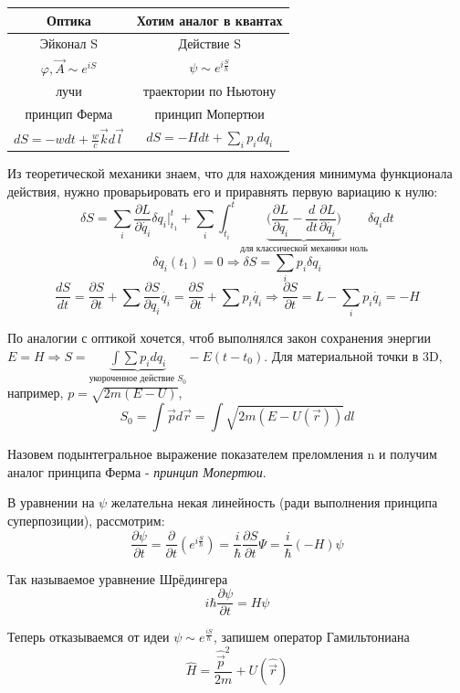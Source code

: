 \begin{table}[h]
\centering
\begin{tabular}[c]{|c|c|}
\hline 
Оптика & Хотим аналог в квантах \\ \hline 
Эйконал S & Действие S \\
$\varphi, \vec{A} \sim e^{iS} $ & $\psi \sim e^{i \frac{S}{\hbar}}$ \\
лучи & траектории по Ньютону \\
принцип Ферма & принцип Мопертюи \\
$dS =-w dt + \frac{w}{c} \vec{k} d\vec{l}$ & $dS=-Hdt+ \sum_{i}p_idq_i$ \\
\hline
\end{tabular}
\end{table}
\par Из теоретической механики знаем, что для нахождения минимума функционала действия, нужно проварьировать его и приравнять первую вариацию к нулю:
$$\delta S = \sum_{i} \frac{\partial L}{\partial \dot{q_i}} \delta q_i \bigg|_{t_1}^{t} + \sum_{i} \int_{t_i}^{t} \underbrace{ \bigg( \frac{\partial L}{\partial q_i} - \frac{d}{dt} \frac{\partial L}{\partial \dot{q_i}} \bigg) }_{\text{для классической механики ноль}} \delta q_i dt $$
$$ \delta q_i(t_1)=0 \Longrightarrow \delta S = \sum_{i} p_i \delta q_i $$
$$ \frac{dS}{dt} = \frac{\partial S}{\partial t} +\sum \frac{\partial S}{\partial q_i} \dot{q_i} = \frac{\partial S}{\partial t}+ \sum p_i \dot{q_i} \Longrightarrow \frac{\partial S}{\partial t} = L -  \sum_{i} p_i \dot{q_i}= -H  $$
\par По аналогии с оптикой хочется, чтоб выполнялся закон сохранения энергии $E=H \Longrightarrow S = \underbrace{\int \sum p_i dq_i}_{\text{укороченное действие }S_0} - E(t-t_0)$. Для материальной точки в 3D, например, $p=\sqrt{2m(E-U)}$, $$S_0 = \int \vec{p}d \vec{r}=\int \sqrt{2m(E-U(\vec{r}))} dl $$
\par Назовем подынтегральное выражение показателем преломления n и получим аналог принципа Ферма - \textit{принцип Мопертюи}.
\par В уравнении на $\psi$ желательна некая линейность (ради выполнения принципа суперпозиции), рассмотрим:
$$ \frac{\partial \psi}{\partial t} =\frac{\partial}{\partial t} ( e^{i \frac{S}{\hbar}} ) = \frac{i}{\hbar} \frac{\partial S}{\partial t} \Psi =  \frac{i}{\hbar} (-H) \psi$$
\par Так называемое уравнение Шрёдингера
$$ i \hbar \frac{\partial \psi}{\partial t} = H \psi $$
\par Теперь отказываемся от идеи $\psi \sim e^{\frac{iS}{\hbar}}$, запишем оператор Гамильтониана $$\hat{H} = \frac{\hat{\vec{p}}^2}{2m}+U(\hat{\vec{r}})$$
